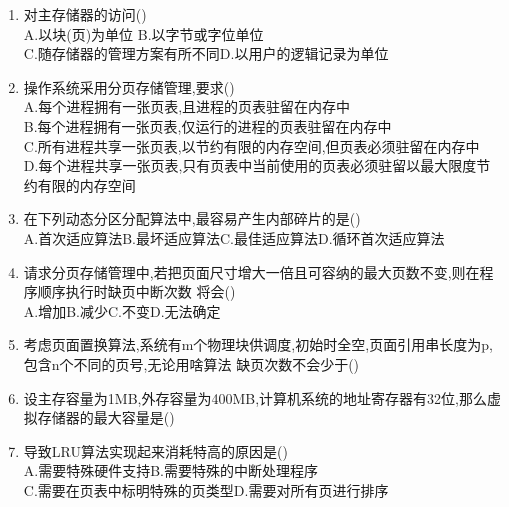 \documentclass[12pt, a4paper, oneside, UTF8]{ctexbook}
\begin{document}
\begin{enumerate}
    \item 对主存储器的访问() \\
    A.以块(页)为单位 \qquad B.以字节或字位单位 \\
    C.随存储器的管理方案有所不同\qquad D.以用户的逻辑记录为单位

    \item 操作系统采用分页存储管理,要求() \\
    A.每个进程拥有一张页表,且进程的页表驻留在内存中 \\
    B.每个进程拥有一张页表,仅运行的进程的页表驻留在内存中\\
    C.所有进程共享一张页表,以节约有限的内存空间,但页表必须驻留在内存中 \\
    D.每个进程共享一张页表,只有页表中当前使用的页表必须驻留以最大限度节约有限的内存空间

    \item 在下列动态分区分配算法中,最容易产生内部碎片的是()  \\
    A.首次适应算法\qquad B.最坏适应算法\qquad C.最佳适应算法\qquad D.循环首次适应算法

    \item 请求分页存储管理中,若把页面尺寸增大一倍且可容纳的最大页数不变,则在程序顺序执行时缺页中断次数
    将会() \\
    A.增加\qquad B.减少\qquad C.不变\qquad D.无法确定

    \item 考虑页面置换算法,系统有m个物理块供调度,初始时全空,页面引用串长度为p,包含n个不同的页号,无论用啥算法
    缺页次数不会少于()

    \item 设主存容量为1MB,外存容量为400MB,计算机系统的地址寄存器有32位,那么虚拟存储器的最大容量是() 

    \item 导致LRU算法实现起来消耗特高的原因是() \\
    A.需要特殊硬件支持\qquad B.需要特殊的中断处理程序 \\
    C.需要在页表中标明特殊的页类型\qquad D.需要对所有页进行排序

\end{enumerate}
\ifx\allfiles\undefined
\end{document}
